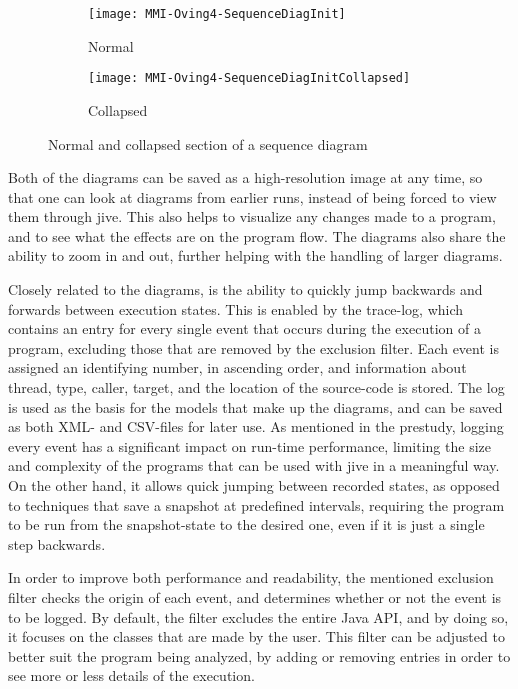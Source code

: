 \begin{figure}[H]
	\centering
	\begin{subfigure}{\textwidth}
		\centering
		\texttt{[image: MMI-Oving4-SequenceDiagInit]}
		\caption{Normal}
		\label{fig:seqOving4CollapseA}
	\end{subfigure}
	\begin{subfigure}{\textwidth}
		\centering
		\texttt{[image: MMI-Oving4-SequenceDiagInitCollapsed]}
		\caption{Collapsed}
		\label{fig:seqOving4CollapseB}
	\end{subfigure}
	\caption{Normal and collapsed section of a sequence diagram}
	\label{fig:seqOving4Collapse} 
\end{figure}

Both of the diagrams can be saved as a high-resolution image at any time, so that one can look at diagrams from earlier runs, instead of being forced to view them through \gls{jive}.
This also helps to visualize any changes made to a program, and to see what the effects are on the program flow.
The diagrams also share the ability to zoom in and out, further helping with the handling of larger diagrams.

Closely related to the diagrams, is the ability to quickly jump backwards and forwards between execution states.%
This is enabled by the trace-log, which contains an entry for every single event that occurs during the execution of a program, excluding those that are removed by the exclusion filter.
Each event is assigned an identifying number, in ascending order, and information about thread, type, caller, target, and the location of the source-code is stored.
The log is used as the basis for the models that make up the diagrams, and can be saved as both XML- and CSV-files for later use.
As mentioned in the prestudy, logging every event has a significant impact on run-time performance, limiting the size and complexity of the programs that can be used with \gls{jive} in a meaningful way.
On the other hand, it allows quick jumping between recorded states, as opposed to techniques that save a snapshot at predefined intervals, requiring the program to be run from the snapshot-state to the desired one, even if it is just a single step backwards.

In order to improve both performance and readability, the mentioned exclusion filter checks the origin of each event, and determines whether or not the event is to be logged.
By default, the filter excludes the entire Java API, and by doing so, it focuses on the classes that are made by the user.%
This filter can be adjusted to better suit the program being analyzed, by adding or removing entries in order to see more or less details of the execution.

